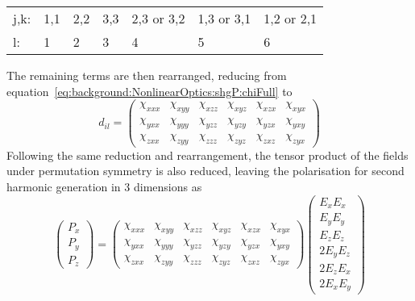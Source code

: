 \begin{table}[H]
\centering
\caption{}
\begin{tabular}{lllllll}
j,k: & 1,1 & 2,2 & 3,3 & 2,3 or 3,2 & 1,3 or 3,1 & 1,2 or 2,1 \\
l:   & 1   & 2   & 3   & 4          & 5          & 6          
\end{tabular}
\label{table:jkl}
\end{table}
The remaining terms are then rearranged, reducing from equation~\ref{eq:background:NonlinearOptics:shgP:chiFull} to
\begin{equation}\label{eq:background:NonlinearOptics:permutation:dil}
	d_{il}=
	\begin{pmatrix}
		\chi_{xxx} & \chi_{xyy} & \chi_{xzz} & \chi_{xyz} & \chi_{xzx} & \chi_{xyx}\\ 
		\chi_{yxx} & \chi_{yyy} & \chi_{yzz} & \chi_{yzy} & \chi_{yzx} & \chi_{yxy}\\ 
		\chi_{zxx} & \chi_{zyy} & \chi_{zzz} & \chi_{zyz} & \chi_{zxz} & \chi_{zyx}
	\end{pmatrix}
\end{equation}
Following the same reduction and rearrangement, the tensor product of the fields under permutation symmetry is also reduced, leaving the polarisation for second harmonic generation in 3 dimensions as
\begin{equation}\label{eq:background:NonlinearOptics:permutation:PshgFull}
	\begin{pmatrix}
		P_{x}\\ 
		P_{y}\\ 
		P_{z}
	\end{pmatrix} =
	\begin{pmatrix}
		\chi_{xxx} & \chi_{xyy} & \chi_{xzz} & \chi_{xyz} & \chi_{xzx} & \chi_{xyx}\\ 
		\chi_{yxx} & \chi_{yyy} & \chi_{yzz} & \chi_{yzy} & \chi_{yzx} & \chi_{yxy}\\ 
		\chi_{zxx} & \chi_{zyy} & \chi_{zzz} & \chi_{zyz} & \chi_{zxz} & \chi_{zyx}
	\end{pmatrix}
	\begin{pmatrix}
		E_{x}E_{x}\\ 
		E_{y}E_{y}\\ 
		E_{z}E_{z}\\
		2E_{y}E_{z}\\ 
		2E_{z}E_{x}\\ 
		2E_{x}E_{y}
	\end{pmatrix}
\end{equation}

